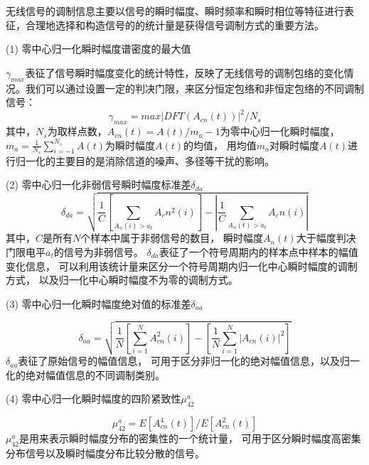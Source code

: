 无线信号的调制信息主要以信号的瞬时幅度、瞬时频率和瞬时相位等特征进行表征，合理地选择和构造信号的的统计量是获得信号调制方式的重要方法\cite{杨杰2014通信信号调制识别}。\par

(1) 零中心归一化瞬时幅度谱密度的最大值\par
$\gamma_{max}$表征了信号瞬时幅度变化的统计特性，反映了无线信号的调制包络的变化情况。我们可以通过设置一定的判决门限，来区分恒定包络和非恒定包络的不同调制信号：
\begin{equation}
\label{eqt_4_2}
\gamma_{max}=max|DFT(A_{cn}(t))|^{2}/N_s
\end{equation}
其中，$N_s$为取样点数，$A_{cn}(t)=A(t)/m_a-1$为零中心归一化瞬时幅度，
$m_a=\frac{1}{N_s}\sum_{i=-1}^{N_s}A(t)$为瞬时幅度$A(t)$的均值，
用均值$m_a$对瞬时幅度$A(t)$进行归一化的主要目的是消除信道的噪声、多径等干扰的影响。\par

(2) 零中心归一化非弱信号瞬时幅度标准差$\delta_{da}$
\begin{equation}
\label{eqt_4_3}
\delta_{da}=\sqrt{\frac{1}{C}\left[\sum_{A_n(i)>a_t} A_cn^2(i)\right]
	- \left|\frac{1}{C} \sum_{A_n(t)>a_t} A_cn(i)\right|}
\end{equation}
其中，$C$是所有$N$个样本中属于非弱信号的数目，
瞬时幅度$A_n(t)$大于幅度判决门限电平$a_t$的信号为非弱信号。
$\delta_{da}$表征了一个符号周期内的样本点中样本的幅值变化信息，
可以利用该统计量来区分一个符号周期内归一化中心瞬时幅度的调制方式，
以及归一化中心瞬时幅度不为零的调制方式。\par

(3) 零中心归一化瞬时幅度绝对值的标准差$\delta_{aa}$\par
\begin{equation}
\label{eqt_4_4}
\delta_{aa} = \sqrt{\frac{1}{N}\left[\sum_{i=1}^{N} A_{cn}^2(i)\right]
	- \left[\frac{1}{N} \sum_{i=1}^{N} \left|A_{cn}(i)\right|^2\right]}
\end{equation}
$\delta_{aa}$表征了原始信号的幅值信息，
可用于区分非归一化的绝对幅值信息，以及归一化的绝对幅值信息的不同调制类别。\par

(4) 零中心归一化瞬时幅度的四阶紧致性$\mu_{42}^{a}$\par
\begin{equation}
\label{eqt_4_5}
\mu_{42}^{a} = E\left[A_{cn}^{4} (t) \right] / E\left[A_{cn}^{2} (t) \right]
\end{equation}
$\mu_{42}^{a}$是用来表示瞬时幅度分布的密集性的一个统计量，
可用于区分瞬时幅度高密集分布信号以及瞬时幅度分布比较分散的信号。

